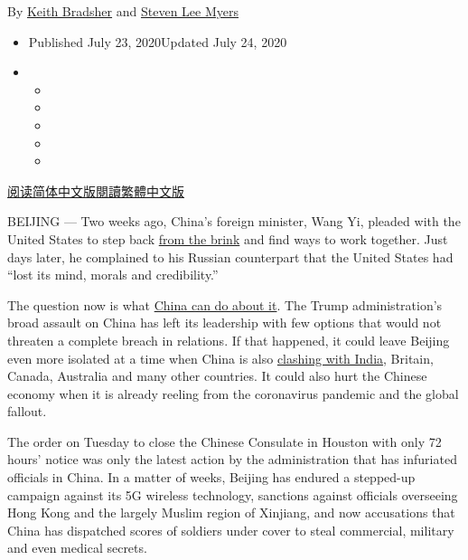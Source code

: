 By \href{https://www.nytimes3xbfgragh.onion/by/keith-bradsher}{Keith
Bradsher} and
\href{https://www.nytimes3xbfgragh.onion/by/steven-lee-myers}{Steven Lee
Myers}

\begin{itemize}
\item
  Published July 23, 2020Updated July 24, 2020
\item
  \begin{itemize}
  \item
  \item
  \item
  \item
  \item
  \end{itemize}
\end{itemize}

\href{https://cn.nytimes3xbfgragh.onion/china/20200724/us-china-consulate/}{阅读简体中文版}\href{https://cn.nytimes3xbfgragh.onion/china/20200724/us-china-consulate/zh-hant/}{閱讀繁體中文版}

BEIJING --- Two weeks ago, China's foreign minister, Wang Yi, pleaded
with the United States to step back
\href{https://www.nytimes3xbfgragh.onion/2020/07/14/world/asia/cold-war-china-us.html}{from
the brink} and find ways to work together. Just days later, he
complained to his Russian counterpart that the United States had ``lost
its mind, morals and credibility.''

The question now is what
\href{https://www.nytimes3xbfgragh.onion/2020/07/24/world/asia/china-us-consulate-chengdu.html}{China
can do about it}. The Trump administration's broad assault on China has
left its leadership with few options that would not threaten a complete
breach in relations. If that happened, it could leave Beijing even more
isolated at a time when China is also
\href{https://www.nytimes3xbfgragh.onion/2020/06/17/world/asia/india-china-border-clashes.html}{clashing
with India}, Britain, Canada, Australia and many other countries. It
could also hurt the Chinese economy when it is already reeling from the
coronavirus pandemic and the global fallout.

The order on Tuesday to close the Chinese Consulate in Houston with only
72 hours' notice was only the latest action by the administration that
has infuriated officials in China. In a matter of weeks, Beijing has
endured a stepped-up campaign against its 5G wireless technology,
sanctions against officials overseeing Hong Kong and the largely Muslim
region of Xinjiang, and now accusations that China has dispatched scores
of soldiers under cover to steal commercial, military and even medical
secrets.

